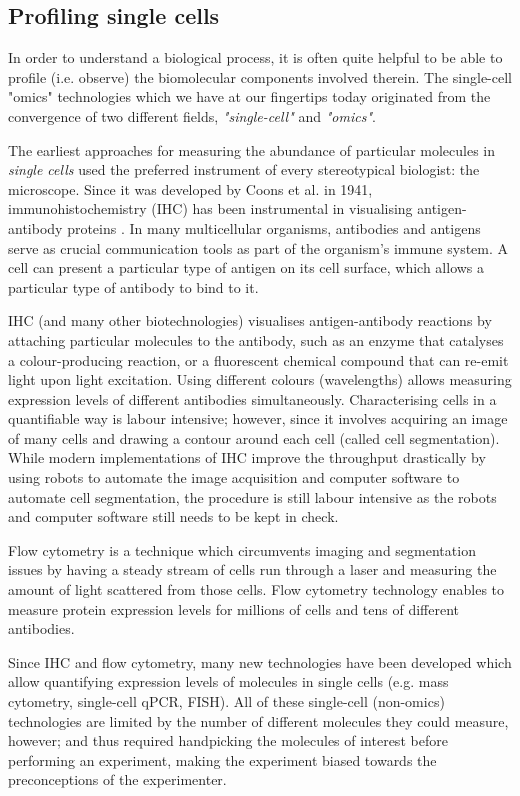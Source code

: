 \subsection{Profiling single cells}
In order to understand a biological process, it is often quite helpful to be able to profile (i.e. observe) the biomolecular components involved therein. The single-cell "omics" technologies which we have at our fingertips today originated from the convergence of two different fields, \emph{"single-cell"} and \emph{"omics"}.

The earliest approaches for measuring the abundance of particular molecules in \emph{single cells} used the preferred instrument of every stereotypical biologist: the microscope. Since it was developed by Coons et al. in 1941, immunohistochemistry (IHC) has been instrumental in visualising antigen-antibody proteins \cite{coons_immunologicalpropertiesantibody_1941}. In many multicellular organisms, antibodies and antigens serve as crucial communication tools as part of the organism's immune system. A cell can present a particular type of antigen on its cell surface, which allows a particular type of antibody to bind to it.

IHC (and many other biotechnologies) visualises antigen-antibody reactions by attaching particular molecules to the antibody, such as an enzyme that catalyses a colour-producing reaction, or a fluorescent chemical compound that can re-emit light upon light excitation. Using different colours (wavelengths) allows measuring expression levels of different antibodies simultaneously. Characterising cells in a quantifiable way is labour intensive; however, since it involves acquiring an image of many cells and drawing a contour around each cell (called cell segmentation). While modern implementations of IHC improve the throughput drastically by using robots to automate the image acquisition and computer software to automate cell segmentation, the procedure is still labour intensive as the robots and computer software still needs to be kept in check.

Flow cytometry \cite{fulwyler_electronicseparationbiological_1965} is a technique which circumvents imaging and segmentation issues by having a steady stream of cells run through a laser and measuring the amount of light scattered from those cells. Flow cytometry technology enables to measure protein expression levels for millions of cells and tens of different antibodies. 

Since IHC and flow cytometry, many new technologies have been developed which allow quantifying expression levels of molecules in single cells (e.g. mass cytometry, single-cell qPCR, FISH). All of these single-cell (non-omics) technologies are limited by the number of different molecules they could measure, however; and thus required handpicking the molecules of interest before performing an experiment, making the experiment biased towards the preconceptions of the experimenter.

